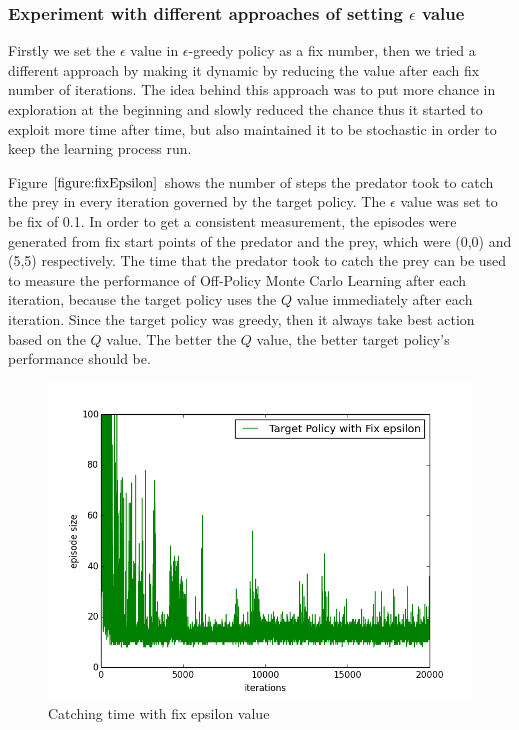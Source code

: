 \documentclass[paper=a4, fontsize=11pt]{scrartcl}
\numberwithin{equation}{section}		%
\numberwithin{figure}{section}			%
\numberwithin{table}{section}				%
\begin{document}
\subsubsection*{Experiment with different approaches of setting $\epsilon$ value}
Firstly we set the $\epsilon$ value in $\epsilon$-greedy policy as a fix number, then we tried a different approach by making it dynamic by reducing the value after each fix number of iterations. The idea behind this approach was to put more chance in exploration at the beginning and slowly reduced the chance thus it started to exploit more time after time, but also maintained it to be stochastic in order to keep the learning process run.

Figure $\ref{figure:fixEpsilon}$ shows the number of steps the predator took to catch the prey in every iteration governed by the target policy. The $\epsilon$ value was set to be fix of 0.1. In order to get a consistent measurement, the episodes were generated from fix start points of the predator and the prey, which were (0,0) and (5,5) respectively. The time that the predator took to catch the prey can be used to measure the performance of Off-Policy Monte Carlo Learning after each iteration, because the target policy uses the $Q$ value immediately after each iteration. Since the target policy was greedy, then it always take best action based on the $Q$ value. The better the $Q$ value, the better target policy's performance should be.

\begin{figure}[H] \centering
\includegraphics[scale=0.5]{target_fix_0_1.png}
\caption{Catching time with fix epsilon value} \label{figure:fixEpsilon}
\end{figure}
\end{document}

